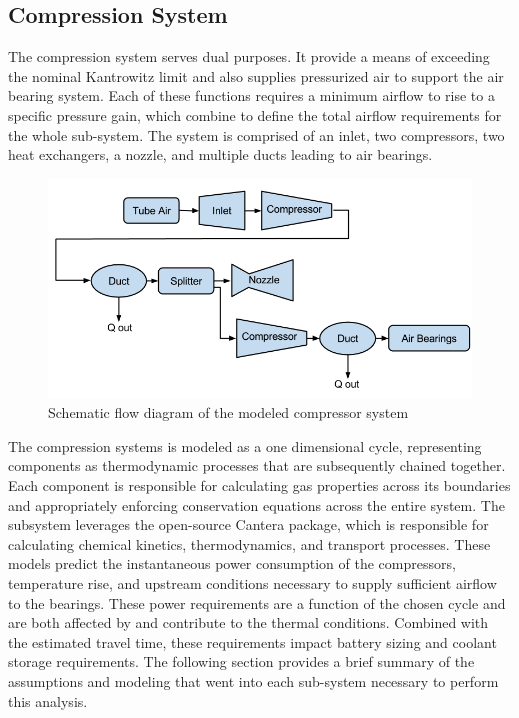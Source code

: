 \documentclass[heading.tex]{subfiles}
\begin{document}
\subsection{Compression System}

The compression system serves dual purposes. It provide a means of exceeding the nominal Kantrowitz limit
and also supplies pressurized air to support the air bearing system.
Each of these functions requires a minimum airflow to rise to a specific pressure gain,
which combine to define the total airflow requirements for the whole sub-system.
The system is comprised of an inlet, two compressors, two heat exchangers, a nozzle, and multiple ducts leading to air bearings.

\begin{figure}[hbtp]
\centering
\includegraphics[width=\textwidth]{images/compressor_schematic.png}
\caption{Schematic flow diagram of the modeled compressor system}
\end{figure}

The compression systems is modeled as a one dimensional cycle, representing components as thermodynamic processes that are
subsequently chained together. Each component is responsible for calculating gas properties across its boundaries and appropriately
enforcing conservation equations across the entire system. The subsystem leverages the open-source Cantera package, which is 
responsible for calculating chemical kinetics, thermodynamics, and transport processes. These models predict the instantaneous
power consumption of the compressors, temperature rise, and upstream conditions necessary to supply sufficient airflow to the bearings.
These power requirements are a function of the chosen cycle and are both affected by and contribute to the thermal conditions. 
Combined with the estimated travel time, these requirements impact battery sizing and coolant storage requirements.
The following section provides a brief summary of the assumptions and modeling that went into each sub-system necessary to perform this analysis.
\end{document}
